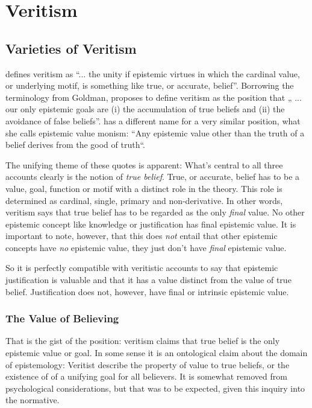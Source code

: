 \documentclass[12pt,numbers=noenddot]{scrartcl}
\begin{document}
\section{Veritism}
\subsection{Varieties of Veritism}\label{sec:varieties}

\textcite[54]{Goldman2002-GOLTUO-2} defines veritism as  “... the unity if epistemic virtues in which the cardinal value, or underlying motif, is something like true, or accurate, belief”. Borrowing the terminology from Goldman, \textcite[360]{Berker2013-BERETA-2} proposes to define veritism as the position that „ ... our only epistemic goals are (i) the accumulation of true beliefs and (ii) the avoidance of false beliefs”. \textcite{Zagzebski2004-ZAGEVM-2} has a different name for a very similar position, what she calls epistemic value monism: “Any epistemic value other than the truth of a belief derives from the good of truth“. 

The unifying theme of these quotes is apparent: What’s central to all three accounts clearly is the notion of \emph{true belief}. True, or accurate, belief has to be a value, goal, function or motif with a distinct role in the theory. This role is determined as cardinal, single, primary and non-derivative. In other words, veritism says that true belief has to be regarded as the only \emph{final} value. No other epistemic concept like knowledge or justification has final epistemic value. It is important to note, however, that this does \emph{not} entail that other epistemic concepts have \emph{no} epistemic value, they just don’t have \emph{final} epistemic value.

So it is perfectly compatible with veritistic accounts to say that epistemic justification is valuable and that it has a value distinct from the value of true belief. Justification does not, however, have final or intrinsic epistemic value.

\subsubsection{The Value of Believing}
That is the gist of the position: veritism claims that true belief is the only epistemic value or goal. In some sense it is an ontological claim about the domain of epistemology: Veritist describe the property of value to true beliefs, or the existence of of a unifying goal for all believers. It is somewhat removed from psychological considerations, but that was to be expected, given this inquiry into the normative.
\end{document}
